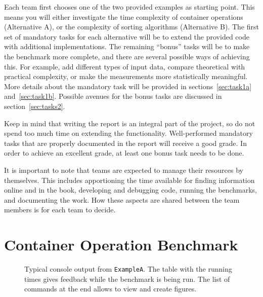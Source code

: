 \documentclass[a4paper,10pt]{article}
\begin{document}
Each team first chooses one of the two provided examples as starting point.
This means you will either investigate the time complexity of container operations (Alternative A), or the complexity of sorting algorithms (Alternative B).
The first set of mandatory tasks for each alternative will be to extend the provided code with additional implementations.
The remaining ``bonus'' tasks will be to make the benchmark more complete, and there are several possible ways of achieving this.
For example, add different types of input data, compare theoretical with practical complexity, or make the measurements more statistically meaningful.
More details about the mandatory task will be provided in sections~\ref{sec:task1a} and~\ref{sec:task1b}.
Possible avenues for the bonus tasks are discussed in section~\ref{sec:tasks2}.

Keep in mind that writing the report is an integral part of the project, so do not spend too much time on extending the functionality.
Well-performed mandatory tasks that are properly documented in the report will receive a good grade.
In order to achieve an excellent grade, at least one bonus task needs to be done.

It is important to note that teams are expected to manage their resources by themselves.
This includes apportioning the time available for finding information online and in the book, developing and debugging code, running the benchmarks, and documenting the work.
How these aspects are shared between the team members is for each team to decide.



\section{Container Operation Benchmark}

\begin{figure}
  \centering
  \caption{
    Typical console output from \texttt{ExampleA}.
    The table with the running times gives feedback while the benchmark is being run.
    The list of commands at the end allows to view and create figures.
  }\label{fig:exa-console}
\end{figure}
  
\end{document}
